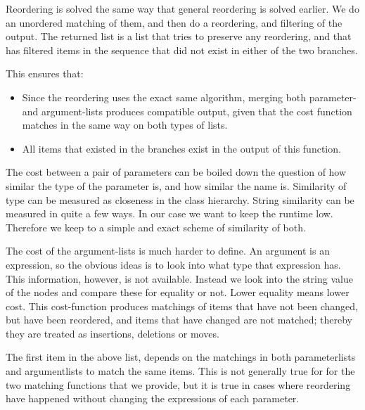 \documentclass[11pt]{article}
\begin{document}
Reordering is solved the same way that general reordering is solved earlier. We do an unordered matching of them, and then do a reordering, and filtering of the output. The returned list is a list that tries to preserve any reordering, and that has filtered items in the sequence that did not exist in either of the two branches.

This ensures that:

\begin{itemize}
   \item Since the reordering uses the exact same algorithm, merging both parameter- and argument-lists produces compatible output, given that the cost function matches in the same way on both types of lists.
   \item All items that existed in the branches exist in the output of this function. 
\end{itemize}

The cost between a pair of parameters can be boiled down the question of how similar the type of the parameter is, and how similar the name is. Similarity of type can be measured as closeness in the class hierarchy. String similarity can be measured in quite a few ways. In our case we want to keep the runtime low. Therefore we keep to a simple and exact scheme of similarity of both.

The cost of the argument-lists is much harder to define. An argument is an expression, so the obvious ideas is to look into what type that expression has. This information, however, is not available. Instead we look into the string value of the nodes and compare these for equality or not. Lower equality means lower cost. This cost-function produces matchings of items that have not been changed, but have been reordered, and items that have changed are not matched; thereby they are treated as insertions, deletions or moves.

The first item in the above list, depends on the matchings in both parameterlists and argumentlists to match the same items. This is not generally true for for the two matching functions that we provide, but it is true in cases where reordering have happened without changing the expressions of each parameter.
\end{document}
